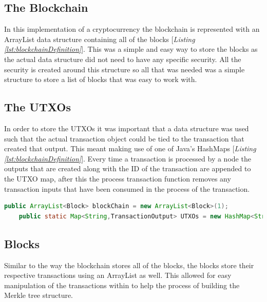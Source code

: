 \documentclass{l4proj}
\begin{document}
\subsection{The Blockchain}
In this implementation of a cryptocurrency the blockchain is represented with an ArrayList data structure containing
all of the blocks [\textit{Listing \ref{lst:blockchainDefinition}}]. This was a simple and easy way to store the blocks as the actual data structure did not need to
have any specific security. All the security is created around this structure so all that was needed was a simple 
structure to store a list of blocks that was easy to work with. 

\subsection{The UTXOs}
In order to store the UTXOs it was important that a data structure was used such that the actual transaction
object could be tied to the transaction that created that output. This meant making use of one of Java's HashMaps
[\textit{Listing \ref{lst:blockchainDefinition}}]. Every time a transaction is processed by a node the outputs that are created 
along with the ID of the transaction are appended to the UTXO map, after this the process transaction function 
removes any transaction inputs that have been consumed in the process of the transaction.

\begin{lstlisting}[language=java, float, caption={This figure shows the definitions for the blockchain and also 
    the UTXO maps. The blockchain is an ArrayList created with one starting block acting as a genesis block. The 
    UTXO map is a HashMap mapping the transaction id to the transaction output created from each transaction.},
    label=lst:blockchainDefinition]
    public ArrayList<Block> blockChain = new ArrayList<Block>(1);
    public static Map<String,TransactionOutput> UTXOs = new HashMap<String,TransactionOutput>();
\end{lstlisting}

\subsection{Blocks}
Similar to the way the blockchain stores all of the blocks, the blocks store their respective transactions 
using an ArrayList as well. This allowed for easy manipulation of the transactions within to help the process of
building the Merkle tree structure.
\end{document}

